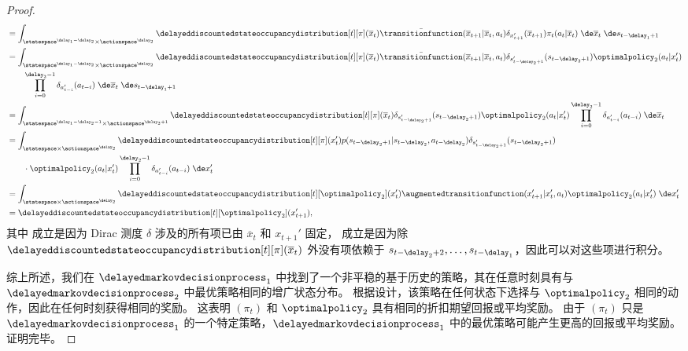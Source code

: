 \begin{proof}
\begin{align}
        &= \int_{\statespace^{\delay_1-\delay_2}\times\actionspace^{\delay_2}} \delayeddiscountedstateoccupancydistribution[t][\pi](\overline x_{t}) \bar{\transitionfunction}(\overline x_{t+1}\vert \overline x_t,a_t) \delta_{x_{t+1}'}(\overline x_{t+1})\pi_t(a_t\vert \overline x_t)\;\de \overline x_t\;\de s_{t-\delay_1+1}
        \nonumber\\
        &= \int_{\statespace^{\delay_1-\delay_2}\times\actionspace^{\delay_2}} \delayeddiscountedstateoccupancydistribution[t][\pi](\overline x_{t}) \bar{\transitionfunction}(\overline x_{t+1}\vert \overline x_t,a_t)
        \delta_{s_{t-\delay_2+1}'}(s_{t-\delay_2+1})\optimalpolicy_2(a_t\vert x_t')
        \nonumber\\
        &\qquad \prod_{i=0}^{\delay_2-1}\delta_{a_{t-i}'}(a_{t-i})\;\de\overline x_t\;\de s_{t-\delay_1+1}
        \nonumber\\
        &= \int_{\statespace^{\delay_1-\delay_2-1}\times\actionspace^{\delay_2+1}} \delayeddiscountedstateoccupancydistribution[t][\pi](\overline x_{t})  \delta_{s_{t-\delay_2+1}'}(s_{t-\delay_2+1})
        \optimalpolicy_2(a_t\vert x_t')
        \prod_{i=0}^{\delay_2-1}\delta_{a_{t-i}'}(a_{t-i})\;\de\overline x_t
        \label{eq:indpt_delta}
        \\
        &= \int_{\statespace\times\actionspace^{\delay_2}} \delayeddiscountedstateoccupancydistribution[t][\pi](x_{t}') p(s_{t-\delay_2+1}\vert s_{t-\delay_2},a_{t-\delay_2}) \delta_{s_{t-\delay_2+1}'}(s_{t-\delay_2+1})
       \nonumber
       \\
        &\qquad \cdot\optimalpolicy_2(a_t\vert x_t')\prod_{i=0}^{\delay_2-1}\delta_{a_{t-i}'}(a_{t-i})\;\de x_t'
        \label{eq:indpt_delta2}
        \\
        &= \int_{\statespace\times\actionspace^{\delay_2}} \delayeddiscountedstateoccupancydistribution[t][\optimalpolicy_2](x_{t}') \augmentedtransitionfunction(x_{t+1}'\vert x_t',a_t)\optimalpolicy_2(a_t\vert x_t')\;\de x_t'
       \nonumber
       \\
       &= \delayeddiscountedstateoccupancydistribution[t][\optimalpolicy_2](x_{t+1}'),\nonumber
    \end{align}
    其中  成立是因为 Dirac 测度 $\delta$ 涉及的所有项已由 $\overline x_t$ 和 $x_{t+1}'$ 固定， 成立是因为除 $\delayeddiscountedstateoccupancydistribution[t][\pi](\overline x_{t})$ 外没有项依赖于 $s_{t-\delay_2+2},\dots,s_{t-\delay_1}$，因此可以对这些项进行积分。

    综上所述，我们在 $\delayedmarkovdecisionprocess_{1}$ 中找到了一个非平稳的基于历史的策略，其在任意时刻具有与 $\delayedmarkovdecisionprocess_{2}$ 中最优策略相同的增广状态分布。
    根据设计，该策略在任何状态下选择与 $\optimalpolicy_2$ 相同的动作，因此在任何时刻获得相同的奖励。
    这表明 $(\pi_t)$ 和 $\optimalpolicy_2$ 具有相同的折扣期望回报或平均奖励。
    由于 $(\pi_t)$ 只是 $\delayedmarkovdecisionprocess_{1}$ 的一个特定策略，$\delayedmarkovdecisionprocess_{1}$ 中的最优策略可能产生更高的回报或平均奖励。证明完毕。
\end{proof}

